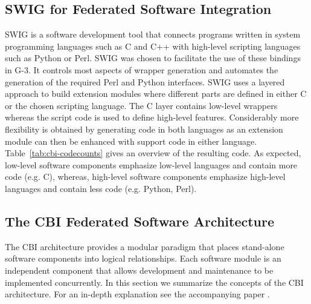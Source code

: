 \documentclass[10pt]{article}
\begin{document}
\subsection*{SWIG for Federated Software Integration}

SWIG is a software development tool that connects programs written
in system programming languages such as C and C++ with high-level scripting 
languages such as Python or Perl. SWIG was chosen to facilitate 
the use of these bindings in
G-3. It controls most aspects of wrapper
generation and automates the generation of the required Perl and
Python interfaces. SWIG uses a layered approach to build extension
modules where different parts are defined in either C or the chosen
scripting language. The C layer contains low-level wrappers whereas
the script code is used to define high-level features.  Considerably
more flexibility is obtained by generating code in both languages as
an extension module can then be enhanced with support code in either
language.  Table~\ref{tab:cbi-codecounts} gives an overview of the
resulting code.  As expected, low-level software components emphasize
low-level languages and contain more code (e.g. C), whereas, high-level
software components emphasize high-level languages and contain less
code (e.g. Python, Perl).


\subsection*{The CBI Federated Software Architecture}
\label{subsec:cbi}

The CBI architecture provides a modular paradigm that places stand-alone
software components into logical relationships.  Each software module
is an independent component that allows development and
maintenance to be implemented concurrently.
In this section we summarize the concepts of the CBI architecture.
For an in-depth explanation see the accompanying paper \cite{cornelis11b}.
\end{document}
